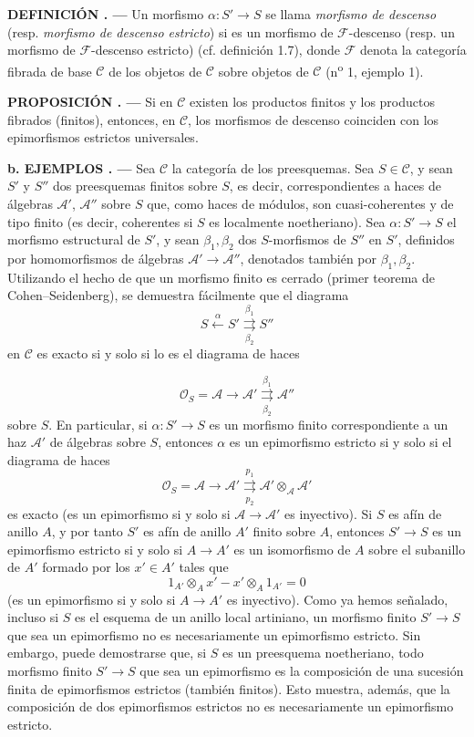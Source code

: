 \documentclass[11pt,twoside,openany]{book}
\numberwithin{equation}{section}
\newcommand{\src}[1]{%
  \phantomsection\hypertarget{src:#1}{}%
  \marginpar{\raggedleft\footnotesize\sffamily #1}%
}
\theoremstyle{plain}
\theoremstyle{definition}
\theoremstyle{remark}
\newcommand{\result}[2]{%
  \par\medskip\noindent\textbf{#1%
  \if\relax\detokenize{#2}\relax\else\space#2\fi. ---}\enspace
}
\newcommand{\FgaUnitKey}{frontmatter}
\renewcommand{\src}[1]{%
  \phantomsection\hypertarget{src:\FgaUnitKey:#1}{}%
  \marginpar{\raggedleft\footnotesize\sffamily #1}%
}
\theoremstyle{plain}
\theoremstyle{definition}
\theoremstyle{remark}
\begin{document}
\result{DEFINICIÓN}{2.4} Un morfismo $\alpha:S'\longrightarrow S$ se llama
\emph{morfismo de descenso} (resp. \emph{morfismo de descenso estricto}) si es
un morfismo de $\mathcal F$-descenso (resp. un morfismo de
$\mathcal F$-descenso estricto) (cf. definición 1.7), donde $\mathcal F$ denota
la categoría fibrada de base $\mathcal C$ de los objetos de $\mathcal C$ sobre
objetos de $\mathcal C$ (n\textsuperscript{o} 1, ejemplo 1).

\result{PROPOSICIÓN}{2.1} Si en $\mathcal C$ existen los productos finitos y
los productos fibrados (finitos), entonces, en $\mathcal C$, los morfismos de
descenso coinciden con los epimorfismos estrictos universales.

\result{b. EJEMPLOS}{} Sea $\mathcal C$ la categoría de los preesquemas. Sea
$S\in\mathcal C$, y sean $S'$ y $S''$ dos preesquemas finitos sobre $S$, es
decir, correspondientes a haces de álgebras $\mathcal A'$, $\mathcal A''$
sobre $S$ que, como haces de módulos, son cuasi-coherentes y de tipo finito (es
decir, coherentes si $S$ es localmente noetheriano). Sea
$\alpha:S'\longrightarrow S$ el morfismo estructural de $S'$, y sean
$\beta_1,\beta_2$ dos $S$-morfismos de $S''$ en $S'$, definidos por
homomorfismos de álgebras $\mathcal A'\longrightarrow\mathcal A''$, denotados
también por $\beta_1,\beta_2$. Utilizando el hecho de que un morfismo finito es
cerrado (primer teorema de Cohen--Seidenberg), se demuestra fácilmente que el
diagrama
\[
  \tag{+}
  S\xleftarrow{\alpha}S'
  \overset{\beta_1}{\underset{\beta_2}{\rightrightarrows}}S''
\]
en $\mathcal C$ es exacto si y solo si lo es el diagrama de haces

\src{306}
\[
  \mathcal O_S=\mathcal A\longrightarrow\mathcal A'
  \overset{\beta_1}{\underset{\beta_2}{\rightrightarrows}}\mathcal A''
\]
sobre $S$. En particular, si $\alpha:S'\longrightarrow S$ es un morfismo
finito correspondiente a un haz $\mathcal A'$ de álgebras sobre $S$, entonces
$\alpha$ es un epimorfismo estricto si y solo si el diagrama de haces
\[
  \mathcal O_S=\mathcal A\longrightarrow\mathcal A'
  \overset{p_1}{\underset{p_2}{\rightrightarrows}}
  \mathcal A'\otimes_{\mathcal A}\mathcal A'
\]
es exacto (es un epimorfismo si y solo si
$\mathcal A\longrightarrow\mathcal A'$ es inyectivo). Si $S$ es afín de anillo
$A$, y por tanto $S'$ es afín de anillo $A'$ finito sobre $A$, entonces
$S'\longrightarrow S$ es un epimorfismo estricto si y solo si
$A\longrightarrow A'$ es un isomorfismo de $A$ sobre el subanillo de $A'$
formado por los $x'\in A'$ tales que
\[
  1_{A'}\otimes_Ax'-x'\otimes_A1_{A'}=0
\]
(es un epimorfismo si y solo si $A\longrightarrow A'$ es inyectivo). Como ya
hemos señalado, incluso si $S$ es el esquema de un anillo local artiniano, un
morfismo finito $S'\longrightarrow S$ que sea un epimorfismo no es
necesariamente un epimorfismo estricto. Sin embargo, puede demostrarse que, si
$S$ es un preesquema noetheriano, todo morfismo finito
$S'\longrightarrow S$ que sea un epimorfismo es la composición de una sucesión
finita de epimorfismos estrictos (también finitos). Esto muestra, además, que
la composición de dos epimorfismos estrictos no es necesariamente un
epimorfismo estricto.
\end{document}
